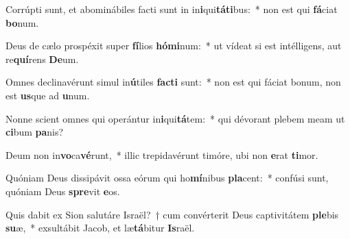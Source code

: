 \item Corrúpti sunt, et abominábiles facti sunt in in\textbf{i}qui\textbf{tá}\textbf{ti}bus:~* non est qui \textbf{fá}ciat \textbf{bo}num.
\item Deus de cælo prospéxit super \textbf{fí}lios \textbf{hó}\textbf{mi}num:~* ut vídeat si est intélligens, aut re\textbf{quí}rens \textbf{De}um.
\item Omnes declinavérunt simul in\textbf{ú}tiles \textbf{fac}\textbf{ti} sunt:~* non est qui fáciat bonum, non est \textbf{us}que ad \textbf{u}num.
\item Nonne scient omnes qui operántur in\textbf{i}qui\textbf{tá}tem:~* qui dévorant plebem meam ut \textbf{ci}bum \textbf{pa}nis?
\item Deum non in\textbf{vo}ca\textbf{vé}runt,~* illic trepidavérunt timóre, ubi non \textbf{e}rat \textbf{ti}mor.
\item Quóniam Deus dissipávit ossa eórum qui ho\textbf{mí}nibus \textbf{pla}cent:~* confúsi sunt, quóniam Deus \textbf{spre}vit \textbf{e}os.
\item Quis dabit ex Sion salutáre Israël?~† cum convérterit Deus captivitátem \textbf{ple}bis \textbf{su}æ,~* exsultábit Jacob, et læ\textbf{tá}bitur \textbf{Is}raël.
